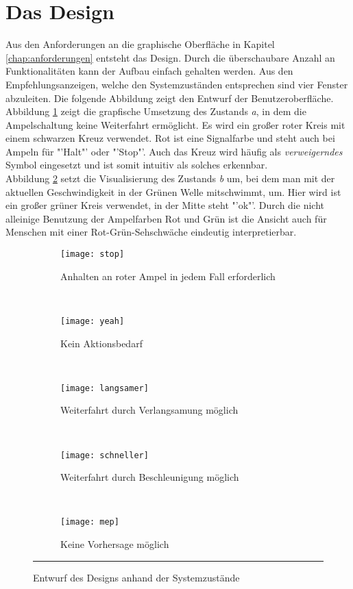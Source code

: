 \section{Das Design}
Aus den Anforderungen an die graphische Oberfläche in Kapitel \ref{chap:anforderungen} entsteht das Design. Durch die überschaubare Anzahl an Funktionalitäten kann der Aufbau einfach gehalten werden. Aus den Empfehlungsanzeigen, welche den Systemzuständen entsprechen sind vier Fenster abzuleiten. Die folgende Abbildung zeigt den Entwurf der Benutzeroberfläche.
Abbildung \ref{fig:stop} zeigt die grapfische Umsetzung des Zustands \textit{a}, in dem die Ampelschaltung keine Weiterfahrt ermöglicht. Es wird ein großer roter Kreis mit einem schwarzen Kreuz verwendet. Rot ist eine Signalfarbe und steht auch bei Ampeln für "'Halt"' oder "'Stop"'. Auch das Kreuz wird häufig als \textit{verweigerndes} Symbol eingesetzt und ist somit intuitiv als solches erkennbar.\\
Abbildung \ref{fig:yeah} setzt die Visualisierung des Zustands \textit{b} um, bei dem man mit der aktuellen Geschwindigkeit in der Grünen Welle mitschwimmt, um. Hier wird ist ein großer grüner Kreis verwendet, in der Mitte steht "'ok"'. Durch die nicht alleinige Benutzung der Ampelfarben Rot und Grün ist die Ansicht auch für Menschen mit einer Rot-Grün-Sehschwäche eindeutig interpretierbar.
\begin{figure}[H]
        \centering
           \begin{subfigure}[t]{0.18\textwidth}
                \texttt{[image: stop]}
                \caption[Systemzustand a]{Anhalten an roter Ampel in jedem Fall erforderlich}
                \label{fig:stop}
        \end{subfigure}
           ~ 
              \begin{subfigure}[t]{0.18\textwidth}
                \texttt{[image: yeah]}
                \caption[Systemzustand b]{Kein Aktionsbedarf}
                \label{fig:yeah}
        \end{subfigure}
           ~
        \begin{subfigure}[t]{0.18\textwidth}
                \texttt{[image: langsamer]}
                \caption[Systemzustand c]{Weiterfahrt durch Verlangsamung  möglich}
                \label{fig:langsamer}
        \end{subfigure}
        ~
        \begin{subfigure}[t]{0.18\textwidth}
                \texttt{[image: schneller]}
                \caption[Systemzustand d]{Weiterfahrt durch Beschleunigung möglich}
                \label{fig:schneller}
        \end{subfigure} 
        ~ 
        \begin{subfigure}[t]{0.18\textwidth}
        	\texttt{[image: mep]}
        	\caption[Systemzustand e]{Keine Vorhersage möglich}
            \label{fig:meh}
        \end{subfigure} 
        \rule{35em}{0.5pt}   
        \caption[Systemzustände im Ampelbereich]{Entwurf des Designs anhand der Systemzustände}
        \label{fig:mockup}
\end{figure}
